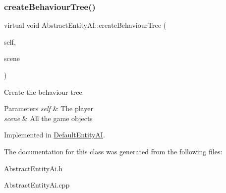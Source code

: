 \subsubsection{\texorpdfstring{create\+Behaviour\+Tree()}{createBehaviourTree()}}
{\footnotesize\ttfamily virtual void Abstract\+Entity\+A\+I\+::create\+Behaviour\+Tree (\begin{DoxyParamCaption}\item[{shared\+\_\+ptr$<$ \mbox{\hyperlink{class_game_object}{Game\+Object}} $>$}]{self,  }\item[{shared\+\_\+ptr$<$ vector$<$ \mbox{\hyperlink{class_game_object}{Game\+Object}} $>$$>$}]{scene }\end{DoxyParamCaption})\hspace{0.3cm}{\ttfamily [pure virtual]}}



Create the behaviour tree. 


\begin{DoxyParams}{Parameters}
{\em self} & The player\\
\hline
{\em scene} & All the game objects\\
\hline
\end{DoxyParams}


Implemented in \mbox{\hyperlink{class_default_entity_a_i_a86fb7d0e18f1e3de4dd1fb3aea5acf84}{Default\+Entity\+AI}}.



The documentation for this class was generated from the following files\+:\begin{DoxyCompactItemize}
\item 
Abstract\+Entity\+Ai.\+h\item 
Abstract\+Entity\+Ai.\+cpp\end{DoxyCompactItemize}
